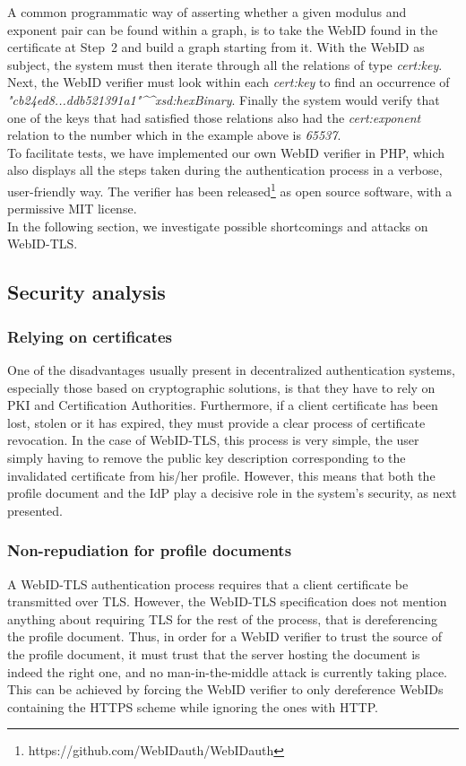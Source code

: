A common programmatic way of asserting whether a given modulus and exponent pair can be found within a graph, is to take the WebID found in the certificate at Step~2 and build a graph starting from it. With the WebID as subject, the system must then iterate through all the relations of type \textit{cert:key}. Next, the WebID verifier must look within each \textit{cert:key} to find an occurrence of \textit{"cb24ed8...ddb521391a1"\^{}\^{}xsd:hexBinary}. Finally the system would verify that one of the keys that had satisfied those relations also had the \textit{cert:exponent} relation to the number which in the example above is \textit{65537}.\\

To facilitate tests, we have implemented our own WebID verifier in PHP, which also displays all the steps taken during the authentication process in a verbose, user-friendly way. The verifier has been released\footnote{https://github.com/WebIDauth/WebIDauth} as open source software, with a permissive MIT license.\\

In the following section, we investigate possible shortcomings and attacks on WebID-TLS.


\subsection{Security analysis}
\label{subsec:webid-tls-security}

\subsubsection{Relying on certificates}
One of the disadvantages usually present in decentralized authentication systems, especially those based on cryptographic solutions, is that they have to rely on PKI and Certification Authorities. Furthermore, if a client certificate has been lost, stolen or it has expired, they must provide a clear process of certificate revocation. In the case of WebID-TLS, this process is very simple, the user simply having to remove the public key description corresponding to the invalidated certificate from his/her profile. However, this means that both the profile document and the IdP play a decisive role in the system's security, as next presented.\\

\subsubsection{Non-repudiation for profile documents}
A WebID-TLS authentication process requires that a client certificate be transmitted over TLS. However, the WebID-TLS specification does not mention anything about requiring TLS for the rest of the process, that is dereferencing the profile document. Thus, in order for a WebID verifier to trust the source of the profile document, it must trust that the server hosting the document is indeed the right one, and no man-in-the-middle attack is currently taking place. This can be achieved by forcing the WebID verifier to only dereference WebIDs containing the HTTPS scheme while ignoring the ones with HTTP.\\

